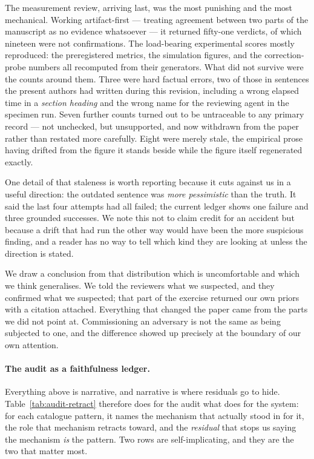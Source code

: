 The measurement review, arriving last, was the most punishing and the most
mechanical.  Working artifact-first --- treating agreement between two parts of
the manuscript as no evidence whatsoever --- it returned fifty-one verdicts, of
which nineteen were not confirmations.  The load-bearing experimental scores
mostly reproduced: the preregistered metrics, the simulation figures, and the
correction-probe numbers all recomputed from their generators.  What did not
survive were the counts around them.  Three were hard factual errors, two of
those in sentences the present authors had written during this revision,
including a wrong elapsed time in a \emph{section heading} and the wrong name
for the reviewing agent in the specimen run.  Seven further counts turned out to
be untraceable to any primary record --- not unchecked, but unsupported, and now
withdrawn from the paper rather than restated more carefully.  Eight were merely
stale, the empirical prose having drifted from the figure it stands beside while
the figure itself regenerated exactly.

One detail of that staleness is worth reporting because it cuts against us in a
useful direction: the outdated sentence was \emph{more pessimistic} than the
truth.  It said the last four attempts had all failed; the current ledger shows
one failure and three grounded successes.  We note this not to claim credit for
an accident but because a drift that had run the other way would have been the
more suspicious finding, and a reader has no way to tell which kind they are
looking at unless the direction is stated.

We draw a conclusion from that distribution which is uncomfortable and which we
think generalises.  We told the reviewers what we suspected, and they confirmed
what we suspected; that part of the exercise returned our own priors with a
citation attached.  Everything that changed the paper came from the parts we did
not point at.  Commissioning an adversary is not the same as being subjected to
one, and the difference showed up precisely at the boundary of our own
attention.

\paragraph{The audit as a faithfulness ledger.}  Everything above is narrative,
and narrative is where residuals go to hide.  Table~\ref{tab:audit-retract}
therefore does for the audit what \xretract{} does for the system: for each catalogue pattern, it names the mechanism that actually stood
in for it, the role that mechanism retracts toward, and the \emph{residual} that
stops us saying the mechanism \emph{is} the pattern.  Two rows are
self-implicating, and they are the two that matter most.

